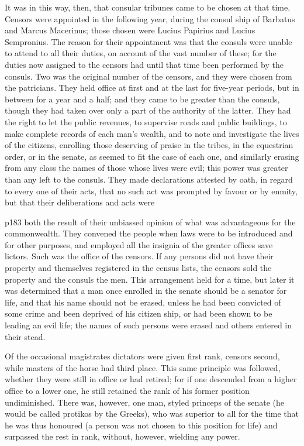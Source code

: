 It was in this way, then, that consular tribunes came to be chosen at that time. Censors were appointed in the following year, during the consul ­ship of Barbatus and Marcus Macerinus; those chosen were Lucius Papirius and Lucius Sempronius. The reason for their appointment was that the consuls were unable to attend to all their duties, on account of the vast number of these; for the duties now assigned to the censors had until that time been performed by the consuls. Two was the original number of the censors, and they were chosen from the patricians. They held office at first and at the last for five-year periods, but in between for a year and a half; and they came to be greater than the consuls, though they had taken over only a part of the authority of the latter. They had the right to let the public revenues, to supervise roads and public buildings, to make complete records of each man's wealth, and to note and investigate the lives of the citizens, enrolling those deserving of praise in the tribes, in the equestrian order, or in the senate, as seemed to fit the case of each one, and similarly erasing from any class the names of those whose lives were evil; this power was greater than any left to the consuls. They made declarations attested by oath, in regard to every one of their acts, that no such act was prompted by favour or by enmity, but that their deliberations and acts were

p183 both the result of their unbiassed opinion of what was advantageous for the commonwealth. They convened the people when laws were to be introduced and for other purposes, and employed all the insignia of the greater offices save lictors. Such was the office of the censors. If any persons did not have their property and themselves registered in the census lists, the censors sold the property and the consuls the men. This arrangement held for a time, but later it was determined that a man once enrolled in the senate should be a senator for life, and that his name should not be erased, unless he had been convicted of some crime and been deprived of his citizen ­ship, or had been shown to be leading an evil life; the names of such persons were erased and others entered in their stead.

Of the occasional magistrates dictators were given first rank, censors second, while masters of the horse had third place. This same principle was followed, whether they were still in office or had retired; for if one descended from a higher office to a lower one, he still retained the rank of his former position undiminished. There was, however, one man, styled princeps of the senate (he would be called protikos by the Greeks), who was superior to all for the time that he was thus honoured (a person was not chosen to this position for life) and surpassed the rest in rank, without, however, wielding any power.

